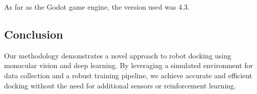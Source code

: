 As far as the Godot game engine, the version used was 4.3.

\subsection{Conclusion}
Our methodology demonstrates a novel approach to robot docking using monocular vision and deep learning. By leveraging a simulated environment for data collection and a robust training pipeline, we achieve accurate and efficient docking without the need for additional sensors or reinforcement learning.

